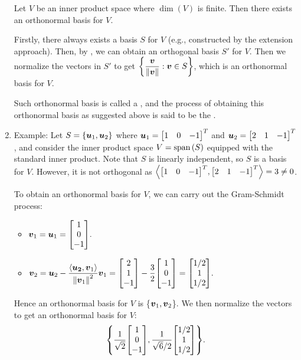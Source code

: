 \begin{enumerate}
\begin{corollary}
\label{cor:exist-orthonormal-basis}
Let \(V\) be an inner product space where \(\dim(V)\) is finite. Then there
exists an orthonormal basis for \(V\).
\end{corollary}
\begin{pf}
Firstly, there always exists a basis \(S\) for \(V\) (e.g., constructed by the
extension approach). Then, by , we can obtain
an orthogonal basis \(S'\) for \(V\). Then we normalize the vectors in \(S'\)
to get \(\displaystyle \qty{\frac{\vb*{v}}{\norm{\vb*{v}}}:\vb*{v}\in S}\),
which is an orthonormal basis for \(V\).

\begin{note}
Such orthonormal basis is called a , and
the process of obtaining this orthonormal basis as suggested above is said to
be the .
\end{note}
\end{pf}

\item Example: Let \(S=\{\vb*{u}_1,\vb*{u}_2\}\) where
\(\vect{u}_1=\mqty[1&0&-1]^{T}\) and \(\vect{u}_2=\mqty[2&1&-1]^{T}\), and
consider the inner product space \(V=\operatorname{span}\qty(S)\) equipped with the standard inner
product. Note that \(S\) is linearly independent, so \(S\) is a basis for
\(V\). However, it is not orthogonal as
\(\inner{\mqty[1&0&-1]^{T}}{\mqty[2&1&-1]^{T}}=3\ne 0\).

To obtain an orthonormal basis for \(V\), we can carry out the Gram-Schmidt
process:
\begin{itemize}
\item \(\displaystyle \vect{v}_1=\vect{u}_1=\mqty[1\\ 0\\ -1].\) 
\item \(\displaystyle
\vect{v}_2=\vect{u}_2-\frac{\inner{\vect{\vect{u}_2}}{\vect{v}_1}}{\norm{\vect{v}_1}^{2}}\vect{v}_1
=\mqty[2\\ 1\\ -1]-\frac{3}{2}\mqty[1\\ 0\\ -1]
=\mqty[1/2\\ 1\\ 1/2].
\)
 \end{itemize}
Hence an orthonormal basis for \(V\) is \{\(\vb*{v}_1,\vb*{v}_2\)\}. We then
normalize the vectors to get an orthonormal basis for \(V\):
\[
\qty{\frac{1}{\sqrt{2}}\mqty[1\\ 0\\ -1],
\frac{1}{\sqrt{6}/2}\mqty[1/2\\ 1\\ 1/2]
}.
\]
\end{enumerate}
